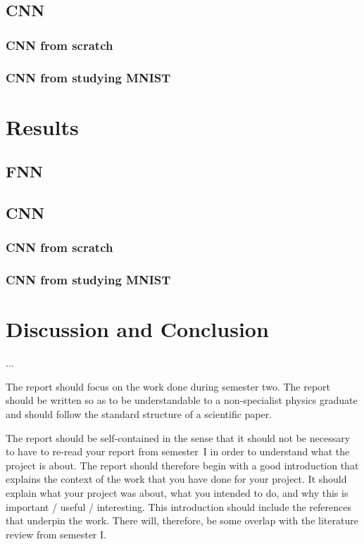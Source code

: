 \documentclass[a4paper,fleqn,usenatbib]{mnras}
\begin{document}
\subsection{CNN}

\subsubsection{CNN from scratch}

\subsubsection{CNN from studying MNIST}

\section{Results}

\subsection{FNN}

\subsection{CNN}

\subsubsection{CNN from scratch}

\subsubsection{CNN from studying MNIST}

\section{Discussion and Conclusion}
...




The report should focus on the work done during semester two. The report should be written so as to be understandable to a non-specialist physics graduate and should follow the standard structure of a scientific paper. 

The report should be self-contained in the sense that it should not be necessary to have to re-read your report from semester~I in order to understand what the project is about. The report should therefore begin with a good introduction that explains the context of the work that you have done for your project. It should explain what your project was about, what you intended to do, and why this is important / useful / interesting. This introduction should include the references that underpin the work. There will, therefore, be some overlap with the literature review from semester I.
\end{document}
